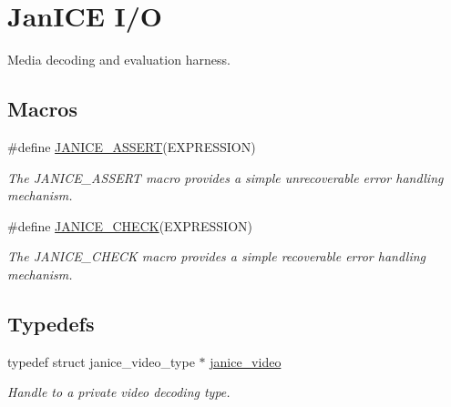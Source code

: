 \hypertarget{group__janice__io}{}\section{Jan\+I\+C\+E I/\+O}
\label{group__janice__io}


Media decoding and evaluation harness.  


\subsection*{Macros}
\begin{DoxyCompactItemize}
\item 
\#define \hyperlink{group__janice__io_ga39a97708cd80add78fa1fccf8b23c6f3}{J\+A\+N\+I\+C\+E\+\_\+\+A\+S\+S\+E\+R\+T}(E\+X\+P\+R\+E\+S\+S\+I\+O\+N)                                                                      
\begin{DoxyCompactList}\small\item\em The {\ttfamily J\+A\+N\+I\+C\+E\+\_\+\+A\+S\+S\+E\+R\+T} macro provides a simple unrecoverable error handling mechanism. \end{DoxyCompactList}\item 
\#define \hyperlink{group__janice__io_ga2d8bd9514bf7749699990e03827a2a07}{J\+A\+N\+I\+C\+E\+\_\+\+C\+H\+E\+C\+K}(E\+X\+P\+R\+E\+S\+S\+I\+O\+N)                      
\begin{DoxyCompactList}\small\item\em The {\ttfamily J\+A\+N\+I\+C\+E\+\_\+\+C\+H\+E\+C\+K} macro provides a simple recoverable error handling mechanism. \end{DoxyCompactList}\end{DoxyCompactItemize}
\subsection*{Typedefs}
\begin{DoxyCompactItemize}
\item 
\hypertarget{group__janice__io_ga01c80201c1ce11f8c7a52cf9493b3ee2}{}typedef struct janice\+\_\+video\+\_\+type $\ast$ \hyperlink{group__janice__io_ga01c80201c1ce11f8c7a52cf9493b3ee2}{janice\+\_\+video}\label{group__janice__io_ga01c80201c1ce11f8c7a52cf9493b3ee2}

\begin{DoxyCompactList}\small\item\em Handle to a private video decoding type. \end{DoxyCompactList}\end{DoxyCompactItemize}
